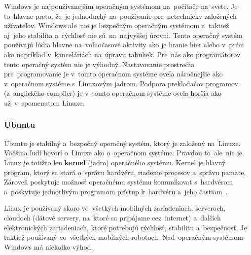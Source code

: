 Windows je najpoužívanejším operačným systémom na~počítače na~svete. Je to~hlavne preto, že~je jednoduchý na~používanie
pre~netechnicky založených užívateľov. Windows ale~nie je bezpečným operačným systémom a~taktiež aj~jeho stabilita a~rýchlosť
nie sú~na~najvyššej úrovni. Tento operačný systém používajú lúdia hlavne na~voľnočasové aktivity ako je hranie hier
alebo v~práci ako napríklad v~kanceláriách na~úpravu tabuliek. Pre~nás ako programátorov tento operačný systém nie je
výhodný. Nastavovanie prostredia pre~programovanie je v~tomto operačnom systéme oveľa náročnejšie ako v~operačnom systéme
s~Linuxovým jadrom. Podpora prekladačov programov (z~anglického compiler) je v~tomto operačnom systéme oveľa horšia
ako už~v~spomenutom Linuxe.

\subsubsection{Ubuntu}
\label{sec:ubuntu}

Ubuntu je stabilný a~bezpečný operačný systém, ktorý je založený na~Linuxe. Väčšina ľudí hovorí o~Linuxe ako o~operačnom systéme. Pravdou
to~ale~nie je. Linux je totižto len \textbf{kernel} (jadro) operačného systému. Kernel je hlavný program, ktorý sa stará o~správu hardvéru,
riadenie procesov a~správu pamäte. Zároveň poskytuje možnosť operačnému systému komunikovať s~hardvérom a~poskytuje jednotlivým programom
prístup k~hardvéru a~jeho častiam~\cite{chatgpt}.

Linux je používaný skoro vo~všetkých mobilných zariadeniach, serveroch, cloudoch (dátové servery, na~ktoré sa pripájame cez~internet)
a~ďalších elektronických zariadeniach, ktoré potrebujú rýchlosť, stabilitu a~bezpečnosť. Je taktiež používaný vo~všetkých mobilných
robotoch. Nad~operačným systémom Windows má niekoľko výhod.

